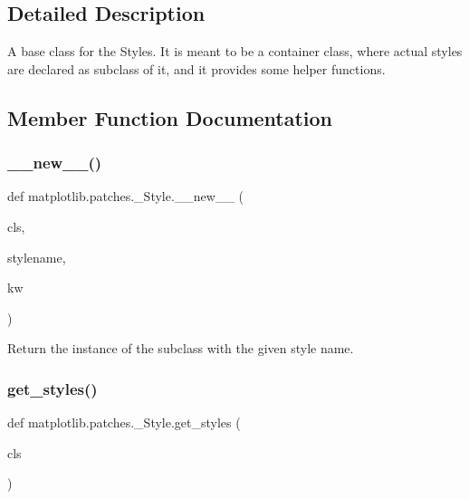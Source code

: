 \subsection{Detailed Description}
\begin{DoxyVerb}A base class for the Styles. It is meant to be a container class,
where actual styles are declared as subclass of it, and it
provides some helper functions.
\end{DoxyVerb}
 

\subsection{Member Function Documentation}
\mbox{\label{classmatplotlib_1_1patches_1_1__Style_a96396993e285643acc4920a7f6f28462}} 
\subsubsection{\texorpdfstring{\+\_\+\+\_\+new\+\_\+\+\_\+()}{\_\_new\_\_()}}
{\footnotesize\ttfamily def matplotlib.\+patches.\+\_\+\+Style.\+\_\+\+\_\+new\+\_\+\+\_\+ (\begin{DoxyParamCaption}\item[{}]{cls,  }\item[{}]{stylename,  }\item[{}]{kw }\end{DoxyParamCaption})}

\begin{DoxyVerb}Return the instance of the subclass with the given style name.\end{DoxyVerb}
 \mbox{\label{classmatplotlib_1_1patches_1_1__Style_aef582873693cbd4aad8ad01cec9aa611}} 
\subsubsection{\texorpdfstring{get\+\_\+styles()}{get\_styles()}}
{\footnotesize\ttfamily def matplotlib.\+patches.\+\_\+\+Style.\+get\+\_\+styles (\begin{DoxyParamCaption}\item[{}]{cls }\end{DoxyParamCaption})}

